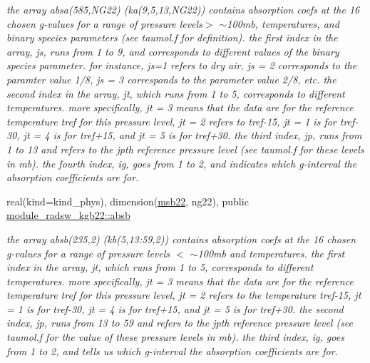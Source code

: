 \begin{DoxyCompactItemize}
\begin{DoxyCompactList}\small\item\em the array absa(585,\+N\+G22) (ka(9,5,13,\+N\+G22)) contains absorption coefs at the 16 chosen g-\/values for a range of pressure levels$>$ $\sim$100mb, temperatures, and binary species parameters (see taumol.\+f for definition). the first index in the array, js, runs from 1 to 9, and corresponds to different values of the binary species parameter. for instance, js=1 refers to dry air, js = 2 corresponds to the paramter value 1/8, js = 3 corresponds to the parameter value 2/8, etc. the second index in the array, jt, which runs from 1 to 5, corresponds to different temperatures. more specifically, jt = 3 means that the data are for the reference temperature tref for this pressure level, jt = 2 refers to tref-\/15, jt = 1 is for tref-\/30, jt = 4 is for tref+15, and jt = 5 is for tref+30. the third index, jp, runs from 1 to 13 and refers to the jpth reference pressure level (see taumol.\+f for these levels in mb). the fourth index, ig, goes from 1 to 2, and indicates which g-\/interval the absorption coefficients are for. \end{DoxyCompactList}\item 
\mbox{\label{group__module__radsw__kgbnn_ga60403e7d343c85e965f3507b0db0f2a5}} 
real(kind=kind\+\_\+phys), dimension(\hyperlink{group__module__radsw__kgbnn_ga3398f8d12ec0349b44197873ac58fd98}{msb22}, ng22), public \hyperlink{group__module__radsw__kgbnn_ga60403e7d343c85e965f3507b0db0f2a5}{module\+\_\+radsw\+\_\+kgb22\+::absb}
\begin{DoxyCompactList}\small\item\em the array absb(235,2) (kb(5,13\+:59,2)) contains absorption coefs at the 16 chosen g-\/values for a range of pressure levels $<$ $\sim$100mb and temperatures. the first index in the array, jt, which runs from 1 to 5, corresponds to different temperatures. more specifically, jt = 3 means that the data are for the reference temperature tref for this pressure level, jt = 2 refers to the temperature tref-\/15, jt = 1 is for tref-\/30, jt = 4 is for tref+15, and jt = 5 is for tref+30. the second index, jp, runs from 13 to 59 and refers to the jpth reference pressure level (see taumol.\+f for the value of these pressure levels in mb). the third index, ig, goes from 1 to 2, and tells us which g-\/interval the absorption coefficients are for. \end{DoxyCompactList}\item 

\end{DoxyCompactItemize}
